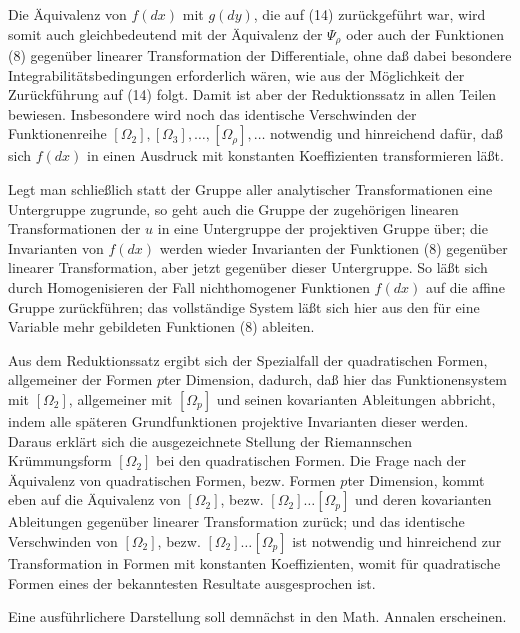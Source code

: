 Die Äquivalenz von \(f(dx)\) mit \(g(dy)\), die auf (14) zurückgeführt
war, wird somit auch gleichbedeutend mit der Äquivalenz der \(\Psi_\rho\)
oder auch der Funktionen (8) gegenüber linearer Transformation der
Differentiale, ohne daß dabei besondere Integrabilitätsbedingungen
erforderlich wären, wie aus der Möglichkeit der Zurückführung auf (14)
folgt. Damit ist aber der Reduktionssatz in allen Teilen bewiesen.
Insbesondere wird noch das identische Verschwinden der Funktionenreihe
\([\Omega_2],[\Omega_3],\ldots,[\Omega_\rho],\ldots\) notwendig und
hinreichend dafür, daß sich \(f(dx)\) in einen Ausdruck mit konstanten
Koeffizienten transformieren läßt.

Legt man schließlich statt der Gruppe aller analytischer Transformationen
eine Untergruppe zugrunde, so geht auch die Gruppe der zugehörigen
linearen Transformationen der \(u\) in eine Untergruppe der projektiven
Gruppe über; die Invarianten von \(f(dx)\) werden wieder Invarianten der
Funktionen (8) gegenüber linearer Transformation, aber jetzt gegenüber
dieser Untergruppe. So läßt sich durch Homogenisieren der Fall
nichthomogener Funktionen \(f(dx)\) auf die affine Gruppe zurückführen;
das vollständige System läßt sich hier aus den für eine Variable mehr
gebildeten Funktionen (8) ableiten.

Aus dem Reduktionssatz ergibt sich der Spezialfall der quadratischen
Formen, allgemeiner der Formen \(p\)ter Dimension, dadurch, daß hier das
Funktionensystem mit \([\Omega_2]\), allgemeiner mit \([\Omega_p]\) und
seinen kovarianten Ableitungen abbricht, indem alle späteren
Grundfunktionen projektive Invarianten dieser werden. Daraus erklärt
sich die ausgezeichnete Stellung der Riemannschen Krümmungsform
\([\Omega_2]\) bei den quadratischen Formen. Die Frage nach der
Äquivalenz von quadratischen Formen, bezw. Formen \(p\)ter Dimension,
kommt eben auf die Äquivalenz von \([\Omega_2]\), bezw.
\([\Omega_2]\ldots[\Omega_p]\) und deren kovarianten Ableitungen
gegenüber linearer Transformation zurück; und das identische Verschwinden
von \([\Omega_2]\), bezw. \([\Omega_2]\ldots[\Omega_p]\) ist notwendig
und hinreichend zur Transformation in Formen mit konstanten Koeffizienten,
womit für quadratische Formen eines der bekanntesten Resultate
ausgesprochen ist.

Eine ausführlichere Darstellung soll demnächst in den Math. Annalen
erscheinen.

\clearpage
\setcounter{footnote}{0}
